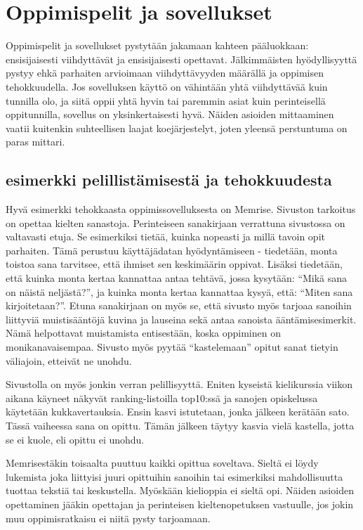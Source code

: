 \documentclass[utf8,bachelor]{gradu3}
\begin{document}
\section{Oppimispelit ja sovellukset}
Oppimispelit ja sovellukset pystytään jakamaan kahteen pääluokkaan: ensisijaisesti viihdyttävät ja ensisijaisesti opettavat. Jälkimmäisten hyödyllisyyttä pystyy ehkä parhaiten arvioimaan viihdyttävyyden määrällä ja oppimisen tehokkuudella. Jos sovelluksen käyttö on vähintään yhtä viihdyttävää kuin tunnilla olo, ja siitä oppii yhtä hyvin tai paremmin asiat kuin perinteisellä oppitunnilla, sovellus on yksinkertaisesti hyvä. Näiden asioiden mittaaminen vaatii kuitenkin suhteellisen laajat koejärjestelyt, joten yleensä perstuntuma on paras mittari.

\subsection{esimerkki pelillistämisestä ja tehokkuudesta}
Hyvä esimerkki tehokkaasta oppimissovelluksesta on Memrise.\parencite[][]{memrise} Sivuston tarkoitus on opettaa kielten sanastoja. Perinteiseen sanakirjaan verrattuna sivustossa on valtavasti etuja. Se esimerkiksi tietää, kuinka nopeasti ja millä tavoin opit parhaiten. Tämä perustuu käyttäjädatan hyödyntämiseen - tiedetään, monta toistoa sana tarvitsee, että ihmiset sen keskimäärin oppivat. Lisäksi tiedetään, että kuinka monta kertaa kannattaa antaa tehtävä, jossa kysytään: “Mikä sana on näistä neljästä?”, ja kuinka monta kertaa kannattaa kysyä, että: “Miten sana kirjoitetaan?”. Etuna sanakirjaan on myös se, että sivusto myös tarjoaa sanoihin liittyviä muistisääntöjä kuvina ja lauseina sekä antaa sanoista ääntämisesimerkit. Nämä helpottavat muistamista entisestään, koska oppiminen on monikanavaisempaa. Sivusto myös pyytää “kastelemaan” opitut sanat tietyin väliajoin, etteivät ne unohdu.

Sivustolla on myös jonkin verran pelillisyyttä. Eniten kyseistä kielikurssia viikon aikana käyneet näkyvät ranking-listoilla top10:ssä ja sanojen opiskelussa käytetään kukkavertauksia. Ensin kasvi istutetaan, jonka jälkeen kerätään sato. Tässä vaiheessa sana on opittu. Tämän jälkeen täytyy kasvia vielä kastella, jotta se ei kuole, eli opittu ei unohdu. 

Memrisestäkin toisaalta puuttuu kaikki opittua soveltava. Sieltä ei löydy lukemista joka liittyisi juuri opittuihin sanoihin tai esimerkiksi mahdollisuutta tuottaa tekstiä tai keskustella. Myöskään kielioppia ei sieltä opi. Näiden asioiden opettaminen jääkin opettajan ja perinteisen kieltenopetuksen vastuulle, jos jokin muu oppimisratkaisu ei niitä pysty tarjoamaan.
\end{document}
